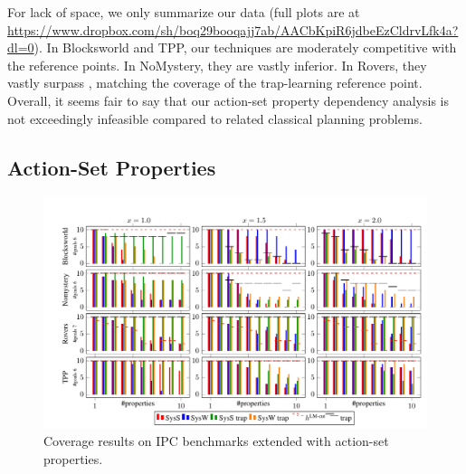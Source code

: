For lack of space, we only summarize our data (full plots are at
\url{https://www.dropbox.com/sh/boq29booqajj7ab/AACbKpiR6jdbeEzCldrvLfk4a?dl=0}).
%
%
In Blocksworld and TPP, our techniques are moderately competitive with
the reference points. In NoMystery, they are vastly inferior. In
Rovers, they vastly surpass \hlmcut, matching the coverage of the
trap-learning reference point. Overall, it seems fair to say that our
action-set property dependency analysis is not exceedingly infeasible
compared to related classical planning problems.




\fi









\ifdefined\longflagdefined

\subsection{Action-Set Properties}

\begin{figure}[htb]
\centering\centering
%
\includegraphics{data/action_set_properties/barchart/barchart.pdf}
\vspace{-0.6cm}
\caption{Coverage results on IPC benchmarks extended with action-set properties.}
\label{fig:barcharts}
\vspace{-0.2cm}
\end{figure}

